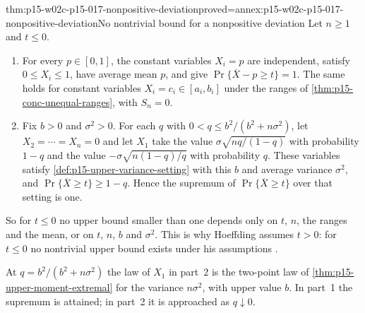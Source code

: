 \begin{hbtheorem}{thm:p15-w02c-p15-017-nonpositive-deviation}{proved=annex:p15-w02c-p15-017-nonpositive-deviation}{No nontrivial bound for a nonpositive deviation}
Let \(n\geq1\) and \(t\leq0\).
\begin{enumerate}
\item For every \(p\in[0,1]\), the constant variables \(X_i=p\) are
independent, satisfy \(0\leq X_i\leq1\), have average mean \(p\), and give
\(\Pr\{\overline X-p\geq t\}=1\). The same holds for constant variables
\(X_i=c_i\in[a_i,b_i]\) under the ranges of
\cref{thm:p15-conc-unequal-ranges}, with \(S_n=0\).
\item Fix \(b>0\) and \(\sigma^2>0\). For each \(q\) with
\(0<q\leq b^2/(b^2+n\sigma^2)\), let \(X_2=\cdots=X_n=0\) and let \(X_1\)
take the value \(\sigma\sqrt{nq/(1-q)}\) with probability \(1-q\) and the
value \(-\sigma\sqrt{n(1-q)/q}\) with probability \(q\). These variables
satisfy \cref{def:p15-upper-variance-setting} with this \(b\) and average
variance \(\sigma^2\), and \(\Pr\{\overline X\geq t\}\geq1-q\). Hence the
supremum of \(\Pr\{\overline X\geq t\}\) over that setting is one.
\end{enumerate}
So for \(t\leq0\) no upper bound smaller than one depends only on \(t\),
\(n\), the ranges and the mean, or on \(t\), \(n\), \(b\) and
\(\sigma^2\). This is why Hoeffding assumes \(t>0\): for \(t\leq0\) no
nontrivial upper bound exists under his assumptions
\cite[p.~13]{Hoeffding1963BoundedSums}.
\end{hbtheorem}

At \(q=b^2/(b^2+n\sigma^2)\) the law of \(X_1\) in part~2 is the
two-point law of \cref{thm:p15-upper-moment-extremal} for the variance
\(n\sigma^2\), with upper value \(b\). In part~1 the supremum is
attained; in part~2 it is approached as \(q\downarrow0\).


